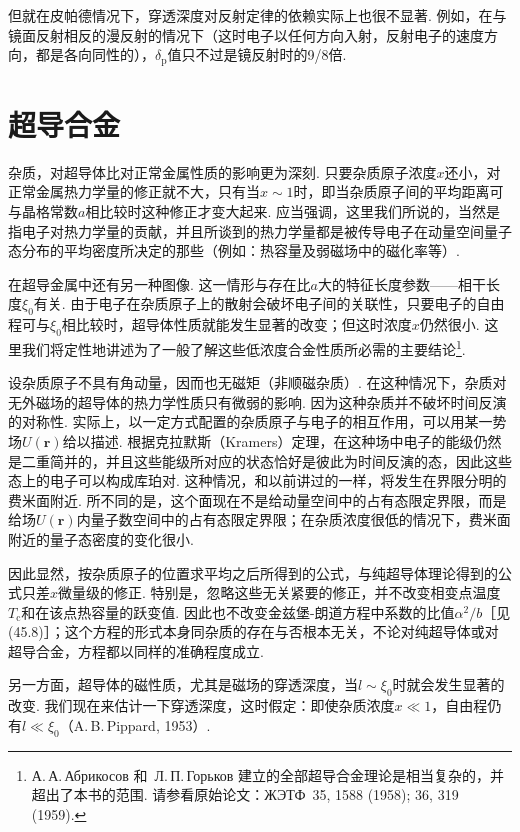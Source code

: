 但就在皮帕德情况下，穿透深度对反射定律的依赖实际上也很不显著. 例如，在与镜面反射相反的漫反射的情况下（这时电子以任何方向入射，反射电子的速度方向，都是各向同性的），$\delta_{\mathrm{p}}$值只不过是镜反射时的9/8倍.

\section{超导合金}

杂质，对超导体比对正常金属性质的影响更为深刻. 只要杂质原子浓度$x$还小，对正常金属热力学量的修正就不大，只有当$x\sim1$时，即当杂质原子间的平均距离可与晶格常数$a$相比较时这种修正才变大起来. 应当强调，这里我们所说的，当然是指电子对热力学量的贡献，并且所谈到的热力学量都是被传导电子在动量空间量子态分布的平均密度所决定的那些（例如：热容量及弱磁场中的磁化率等）.

在超导金属中还有另一种图像. 这一情形与存在比$a$大的特征长度参数——相干长度$\xi_0$有关. 由于电子在杂质原子上的散射会破坏电子间的关联性，只要电子的自由程可与$\xi_0$相比较时，超导体性质就能发生显著的改变；但这时浓度$x$仍然很小. 这里我们将定性地讲述为了一般了解这些低浓度合金性质所必需的主要结论\footnote{А.\,А.\,Абрикосов 和~Л.\,П.\,Горьков 建立的全部超导合金理论是相当复杂的，并超出了本书的范围. 请参看原始论文：ЖЭТФ~35, 1588 (1958); 36, 319 (1959).}.

设杂质原子不具有角动量，因而也无磁矩（非顺磁杂质）. 在这种情况下，杂质对无外磁场的超导体的热力学性质只有微弱的影响. 因为这种杂质并不破坏时间反演的对称性. 实际上，以一定方式配置的杂质原子与电子的相互作用，可以用某一势场$U(\bm{r})$给以描述. 根据克拉默斯（Kramers）定理，在这种场中电子的能级仍然是二重简并的，并且这些能级所对应的状态恰好是彼此为时间反演的态，因此这些态上的电子可以构成库珀对. 这种情况，和以前讲过的一样，将发生在界限分明的费米面附近. 所不同的是，这个面现在不是给动量空间中的占有态限定界限，而是给场$U(\bm{r})$内量子数空间中的占有态限定界限；在杂质浓度很低的情况下，费米面附近的量子态密度的变化很小.

因此显然，按杂质原子的位置求平均之后所得到的公式，与纯超导体理论得到的公式只差$x$微量级的修正. 特别是，忽略这些无关紧要的修正，并不改变相变点温度$T_{\mathrm{c}}$和在该点热容量的跃变值. 因此也不改变金兹堡-朗道方程中系数的比值$\alpha^2/b$［见(45.8)］；这个方程的形式本身同杂质的存在与否根本无关，不论对纯超导体或对超导合金，方程都以同样的准确程度成立.

另一方面，超导体的磁性质，尤其是磁场的穿透深度，当$l\sim\xi_0$时就会发生显著的改变. 我们现在来估计一下穿透深度，这时假定：即使杂质浓度$x\ll1$，自由程仍有$l\ll\xi_0$（A.\,B.\,Pippard, 1953）.


